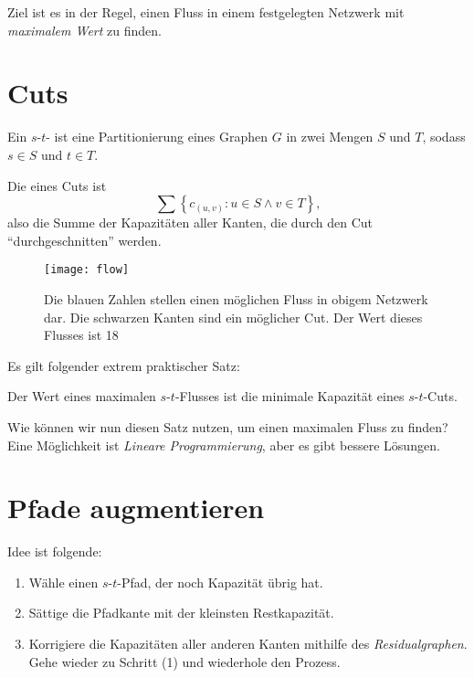 Ziel ist es in der Regel, einen Fluss in einem festgelegten Netzwerk mit \emph{maximalem Wert} zu finden.

\section{Cuts}

\begin{definition}[Cut]
  Ein \( s \)-\( t \)- ist eine Partitionierung eines Graphen \( G \) in zwei Mengen \( S \) und \( T \), sodass \( s \in S \) und \( t \in T \).

  Die  eines Cuts ist
  \begin{equation*}
    \sum\left \{ c_{(u,v)} : u \in S \wedge v \in T \right \}\text{,}
  \end{equation*}
  also die Summe der Kapazitäten aller Kanten, die durch den Cut ``durchgeschnitten'' werden.
\end{definition}

\begin{figure}[H]
  \texttt{[image: flow]}
  \caption{Die blauen Zahlen stellen einen möglichen Fluss in obigem Netzwerk dar. Die schwarzen Kanten sind ein möglicher Cut. Der Wert dieses Flusses ist 18}
\end{figure}

Es gilt folgender extrem praktischer Satz:

\begin{theorem}
  Der Wert eines maximalen \( s \)-\( t \)-Flusses ist die minimale Kapazität eines \( s \)-\( t \)-Cuts.
\end{theorem}

Wie können wir nun diesen Satz nutzen, um einen maximalen Fluss zu finden? Eine Möglichkeit ist \emph{Lineare Programmierung}, aber es gibt bessere Lösungen.

\section{Pfade augmentieren}

Idee ist folgende:
\begin{enumerate}
  \item Wähle einen \( s \)-\( t \)-Pfad, der noch Kapazität übrig hat.
  \item Sättige die Pfadkante mit der kleinsten Restkapazität.
  \item Korrigiere die Kapazitäten aller anderen Kanten mithilfe des \emph{Residualgraphen}. Gehe wieder zu Schritt (1) und wiederhole den Prozess.
\end{enumerate}


